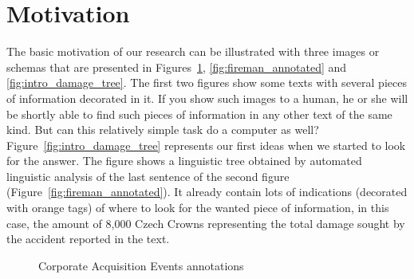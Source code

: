 \section{Motivation}
The basic motivation of our research can be illustrated with three images or schemas that are presented in Figures~\ref{fig:acquisitions_annotated}, \ref{fig:fireman_annotated} and \ref{fig:intro_damage_tree}. The first two figures show some texts with several pieces of information decorated in it. If you show such images to a human, he or she will be shortly able to find such pieces of information in any other text of the same kind. But can this relatively simple task do a computer as well? Figure~\ref{fig:intro_damage_tree} represents our first ideas when we started to look for the answer. The figure shows a linguistic tree obtained by automated linguistic analysis of the last sentence of the second figure (Figure~\ref{fig:fireman_annotated}). It already contain lots of indications (decorated with orange tags) of where to look for the wanted piece of information, in this case, the amount of 8,000 Czech Crowns representing the total damage sought by the accident reported in the text.


\begin{figure}
\centering
{}
\caption{Corporate Acquisition Events annotations}
\label{fig:acquisitions_annotated}
\end{figure}


